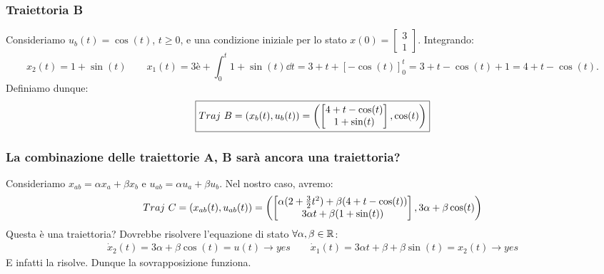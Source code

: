 \documentclass[a4paper]{report}
\begin{document}
\begin{esem}
\subsubsection{Traiettoria B}
Consideriamo $u_b(t) = \cos(t)$, $t \geq 0$, e una condizione iniziale per lo stato $x(0) = \begin{bmatrix}
	3 \\ 1
\end{bmatrix}$. Integrando:
\begin{equation*}
	x_2(t) = 1+\sin(t) \quad \quad x_1(t) =3è+\int_0^t1+\sin(t)\dd{t} = 3
	+t+[-\cos(t)]^t_0 = 3+t-\cos(t) + 1 = 4+t-\cos(t).
\end{equation*}
Definiamo dunque:
\begin{equation*}
	\boxed{Traj \ B = (x_b(t), u_b(t)) = \left( \begin{bmatrix}
		4+t-\cos(t) \\ 1+\sin(t)
	\end{bmatrix}, \cos(t) \right)}
\end{equation*}

\subsubsection{La combinazione delle traiettorie A, B sarà ancora una traiettoria?}
Consideriamo  $x_{ab} = \alpha x_a + \beta x_b$ e $u_{ab} = \alpha u_a + \beta u_b$.  Nel nostro caso, avremo:
\begin{equation*}
	Traj \ C = (x_{ab}(t), u_{ab}(t)) = \left( \begin{bmatrix}
		\alpha(2+\frac{3}{2} t^2) + \beta(4+t-\cos(t)) \\ 3\alpha t + \beta(1+\sin(t))
	\end{bmatrix}, 3\alpha+\beta \cos(t)  \right)
\end{equation*}
Questa è una traiettoria? Dovrebbe risolvere l'equazione di stato $\forall \alpha, \beta \in \mathbb{R}$:
\begin{align*}
	\dot x_2(t) = 3\alpha +\beta \cos (t) = u(t) \rightarrow yes \quad \quad \dot x_1(t) = 3\alpha t +\beta +\beta \sin(t) = x_2(t) \rightarrow yes
\end{align*}
E infatti la risolve. Dunque la sovrapposizione funziona.
\end{esem}
\end{document}
